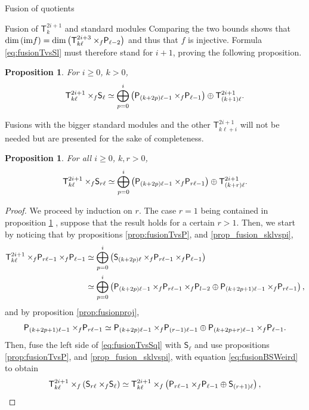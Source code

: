 \documentclass[reqno]{amsart}
\newtheorem{Prop}[Thm]{Proposition}
\newcommand{\ds}[1]{\mathsf S_{#1}}
\newcommand{\dP}[1]{\mathsf P_{#1}}
\newcommand{\xf}{\times\hspace{-0.27em}_f}
\newcommand{\T}[2]{\mathsf{T}^{#1}_{#2}}
\newcommand{\lc}{\ell}
\begin{document}
\begin{section}{Fusion of quotients}
\begin{subsection}{Fusion of $\T{2i+1}{k}$ and standard modules}
Comparing the two bounds shows that $\dim\left(\text{\rm im}f\right) = \dim\left(\T{2i+3}{k\lc}\xf\dP{\lc-2}\right)$ and thus that $f$ is injective. Formula \eqref{eq:fusionTvsSl} must therefore stand for $i+1$, proving the following proposition.
\begin{Prop}\label{prop:fusionTvsSl}
For $i\geq 0$, $k>0$,
\begin{equation}
\T{2i+1}{k\lc}\xf\ds{\lc} \simeq \overset{i}{\underset{p=0}{\bigoplus}}\left( \dP{(k+2p)\lc-1} \xf \dP{\lc-1}\right) \oplus \T{2i+1}{(k+1)\lc}.
\end{equation}
\end{Prop}
Fusions with the bigger standard modules and the other $\T{2i+1}{k\lc +i}$ will not be needed but are presented for the sake of completeness.
\begin{Prop}
For all $i\geq0$, $k,r>0$,
\begin{equation}\label{eq:fusionTvsSql}
\T{2i+1}{k \lc} \xf \ds{r \lc} \simeq \overset{i}{\underset{p=0}{\bigoplus}}\left( \dP{(k+2p)\lc-1} \xf \dP{r\lc-1}\right) \oplus \T{2i+1}{(k+r)\lc}.
\end{equation}
\end{Prop}
\begin{proof}
We proceed by induction on $r$. The case $r=1$ being contained in proposition \ref{prop:fusionTvsSl} , suppose that the result holds for a certain $r>1$. Then, we start by noticing that by propositions \ref{prop:fusionTvsP}, and \ref{prop_fusion_sklvspi}, 
\begin{align*}
	\T{2i+1}{k \lc} \xf \dP{r \lc -1} \xf \dP{\lc -1} &\simeq \overset{i}{\underset{p=0}{\bigoplus}}\left( \ds{(k+2p)\lc} \xf \dP{r\lc-1} \xf \dP{\lc -1}\right)\\
	& \simeq \overset{i}{\underset{p=0}{\bigoplus}}\left(\dP{(k+2p)\lc-1}\xf \dP{r\lc -1}\xf \dP{l-2} \oplus \dP{(k+2p+1)\lc -1} \xf \dP{r\lc -1} \right),
\end{align*}
and by proposition \ref{prop:fusionproj},
\begin{equation}
\dP{(k+2p+1)\lc -1} \xf \dP{r\lc -1} \simeq \dP{(k+2p)\lc -1} \xf \dP{(r-1)\lc -1} \oplus \dP{(k+2p +r)\lc -1}\xf \dP{\lc-1}.
\end{equation}
Then, fuse the left side of \eqref{eq:fusionTvsSql} with $\ds{\lc}$ and use propositions \ref{prop:fusionTvsP}, and \ref{prop_fusion_sklvspi}, with equation \eqref{eq:fusionBSWeird} to obtain
\begin{equation}
	\T{2i+1}{k \lc } \xf \left(\ds{r\lc} \xf \ds{\lc}\right)  \simeq \T{2i+1}{k \lc } \xf\left(\dP{r \lc -1}\xf\dP{\lc -1} \oplus \ds{(r+1)\lc} \right), 

\end{equation}
\end{proof}
\end{subsection}
\end{section}
\end{document}
